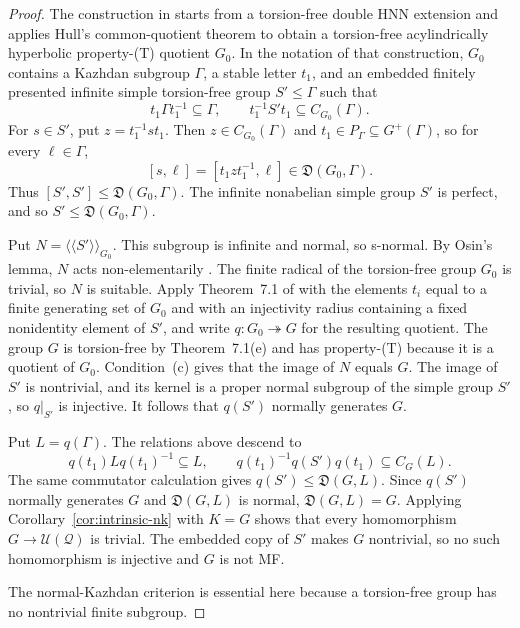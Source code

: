 \documentclass[11pt]{amsart}
\newcommand{\leanstep}[1]{}
\theoremstyle{definition}
\theoremstyle{remark}
\theoremstyle{plain}
\newcommand{\U}{\mathcal U}
\begin{document}
\begin{proof}
The construction in \cite[Section~2]{FFF} starts from a torsion-free double
HNN extension and applies Hull's common-quotient theorem to obtain a
torsion-free acylindrically hyperbolic property-\textup{(T)}
quotient $G_0$.  In the notation of that construction, $G_0$ contains a
Kazhdan subgroup $\Gamma$, a stable letter $t_1$, and an embedded finitely
presented infinite simple torsion-free group $S'\le\Gamma$ such that
\[
 t_1\Gamma t_1^{-1}\subseteq\Gamma,
 \qquad t_1^{-1}S't_1\subseteq C_{G_0}(\Gamma).
\]
For $s\in S'$, put $z=t_1^{-1}st_1$.  Then
$z\in C_{G_0}(\Gamma)$ and $t_1\in P_\Gamma\subseteq G^+(\Gamma)$, so for
every $\ell\in\Gamma$,
\[
 [s,\ell]=[t_1zt_1^{-1},\ell]\in\mathfrak D(G_0,\Gamma).
\]
Thus $[S',S']\le\mathfrak D(G_0,\Gamma)$.  The infinite nonabelian simple
group $S'$ is perfect, and so
$S'\le\mathfrak D(G_0,\Gamma)$.

Put $N=\langle\!\langle S'\rangle\!\rangle_{G_0}$.  This subgroup is infinite and
normal, so s-normal.  By Osin's lemma, $N$ acts non-elementarily
\cite[Lemma~7.1]{Osin}.  The finite radical of the torsion-free group $G_0$ is
trivial, so $N$ is suitable.  Apply Theorem~7.1 of \cite{Hull} with the
elements $t_i$ equal to a finite generating set of $G_0$ and with an
injectivity radius containing a fixed nonidentity element of $S'$, and write
$q\colon G_0\twoheadrightarrow G$ for the resulting quotient.  The group $G$
is torsion-free by Theorem~7.1(e) and has property-\textup{(T)} because it
is a quotient of $G_0$.  Condition~(c) gives that the image of $N$ equals
$G$.  The image of $S'$ is nontrivial, and its kernel is a proper normal
subgroup of the simple group $S'$, so $q|_{S'}$ is injective.  It follows
that $q(S')$ normally generates $G$.

Put $L=q(\Gamma)$.  The relations above descend to
\[
 q(t_1)Lq(t_1)^{-1}\subseteq L,
 \qquad q(t_1)^{-1}q(S')q(t_1)\subseteq C_G(L).
\]
The same commutator calculation gives
$q(S')\le\mathfrak D(G,L)$.  Since $q(S')$ normally generates $G$ and
$\mathfrak D(G,L)$ is normal, $\mathfrak D(G,L)=G$.
Applying Corollary~\ref{cor:intrinsic-nk} with $K=G$ shows that every
homomorphism $G\to\U(\mathcal Q)$ is trivial.  The embedded copy of $S'$
makes $G$ nontrivial, so no such homomorphism is injective and $G$ is not
MF\@.

The normal-Kazhdan criterion is essential here because a torsion-free group
has no nontrivial finite subgroup.
\leanstep{LI.07}
\end{proof}
\end{document}
